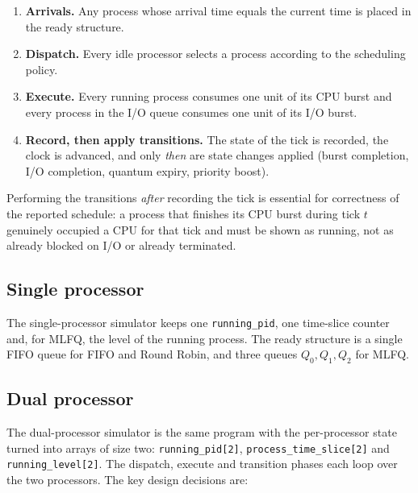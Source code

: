 \documentclass[11pt,a4paper]{article}
\begin{document}
\begin{enumerate}
  \item \textbf{Arrivals.} Any process whose arrival time equals the current time is
        placed in the ready structure.
  \item \textbf{Dispatch.} Every idle processor selects a process according to the
        scheduling policy.
  \item \textbf{Execute.} Every running process consumes one unit of its CPU burst and
        every process in the I/O queue consumes one unit of its I/O burst.
  \item \textbf{Record, then apply transitions.} The state of the tick is recorded,
        the clock is advanced, and only \emph{then} are state changes applied
        (burst completion, I/O completion, quantum expiry, priority boost).
\end{enumerate}

Performing the transitions \emph{after} recording the tick is essential for correctness
of the reported schedule: a process that finishes its CPU burst during tick $t$ genuinely
occupied a CPU for that tick and must be shown as running, not as already blocked on I/O
or already terminated.

\subsection{Single processor}

The single-processor simulator keeps one \texttt{running\_pid}, one time-slice counter
and, for MLFQ, the level of the running process. The ready structure is a single FIFO
queue for FIFO and Round Robin, and three queues $Q_0,Q_1,Q_2$ for MLFQ.

\subsection{Dual processor}\label{sec:dualdesign}

The dual-processor simulator is the same program with the per-processor state turned into
arrays of size two: \texttt{running\_pid[2]}, \texttt{process\_time\_slice[2]} and
\texttt{running\_level[2]}. The dispatch, execute and transition phases each loop over the
two processors. The key design decisions are:
\end{document}
